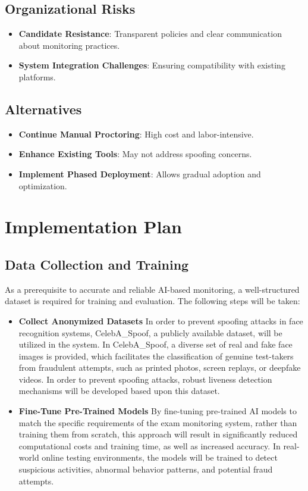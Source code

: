 \documentclass[12pt,a4paper]{article}
\begin{document}
\subsection{Organizational Risks}
\begin{itemize}
\item \textbf{Candidate Resistance}: Transparent policies and clear communication about monitoring practices.
\item \textbf{System Integration Challenges}: Ensuring compatibility with existing platforms.
\end{itemize}

\subsection{Alternatives}
\begin{itemize}
\item \textbf{Continue Manual Proctoring}: High cost and labor-intensive.
\item \textbf{Enhance Existing Tools}: May not address spoofing concerns.
\item \textbf{Implement Phased Deployment}: Allows gradual adoption and optimization.
\end{itemize}

\section{Implementation Plan}

\subsection{Data Collection and Training}

As a prerequisite to accurate and reliable AI-based monitoring, a well-structured dataset is required for training and evaluation. The following steps will be taken:

\begin{itemize}
    \item \textbf{Collect Anonymized Datasets}  
    In order to prevent spoofing attacks in face recognition systems, CelebA\_Spoof, a publicly available dataset, will be utilized in the system. In CelebA\_Spoof, a diverse set of real and fake face images is provided, which facilitates the classification of genuine test-takers from fraudulent attempts, such as printed photos, screen replays, or deepfake videos. In order to prevent spoofing attacks, robust liveness detection mechanisms will be developed based upon this dataset.

    \item \textbf{Fine-Tune Pre-Trained Models}  
    By fine-tuning pre-trained AI models to match the specific requirements of the exam monitoring system, rather than training them from scratch, this approach will result in significantly reduced computational costs and training time, as well as increased accuracy. In real-world online testing environments, the models will be trained to detect suspicious activities, abnormal behavior patterns, and potential fraud attempts.
\end{itemize}
\end{document}
